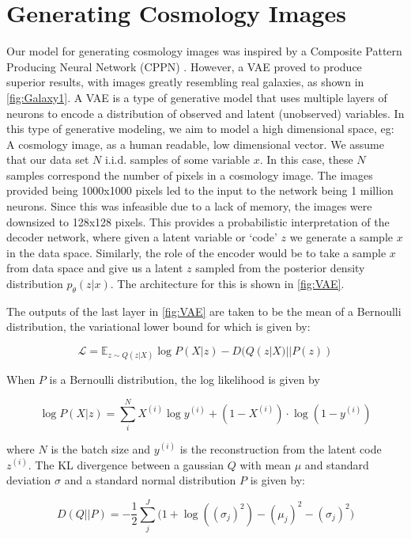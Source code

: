 \documentclass[journal]{IEEEtran}
\begin{document}
\section{Generating Cosmology Images}
Our model for generating cosmology images was inspired by a Composite Pattern Producing Neural Network (CPPN) \cite{CPPN}. However, a VAE proved to produce superior results, with images greatly resembling real galaxies, as shown in \ref{fig:Galaxy1}.
A VAE \cite{VAE} is a type of generative model that uses multiple layers of neurons to encode a distribution of observed and latent (unobserved) variables. In this type of generative modeling, we aim to model a high dimensional space, eg: A cosmology image, as a human readable, low dimensional vector. 
We assume that our data set $N$ i.i.d. samples of some variable $x$. In this case, these $N$ samples correspond the number of pixels in a cosmology image. The images provided being 1000x1000 pixels led to the input to the network being 1 million neurons. Since this was infeasible due to a lack of memory, the images were downsized to 128x128 pixels. This provides a probabilistic interpretation of the decoder network, where given a latent variable or `code' $z$ we generate a sample $x$ in the data space. Similarly, the role of the encoder would be to take a sample $x$ from data space and give us a latent $z$ sampled from the posterior density distribution $p_\theta(z|x)$. The architecture for this is shown in \ref{fig:VAE}. 

The outputs of the last layer in \ref{fig:VAE} are taken to be the mean of a Bernoulli distribution, the variational lower bound for which is given by:

\begin{equation}
\mathcal{L} = \mathbb{E}_{z\sim Q(z|X)}\log P(X|z) - D(Q(z|X)||P(z))
\end{equation}

When $P$ is a Bernoulli distribution, the log likelihood is given by

\begin{equation}
\log P(X|z) = \sum_i^N X^{(i)}\log y^{(i)} + (1 − X^{(i)}) \cdot \log(1 − y^{(i)})
\end{equation}

where $N$ is the batch size and $y^{(i)}$ is the reconstruction from the latent code $z^{(i)}$. The KL divergence between a gaussian $Q$ with mean $\mu$ and standard deviation $\sigma$ and a standard normal distribution $P$ is given by:

\begin{equation}
D(Q||P) = -\frac{1}{2}\sum_j^J \big(1 + \log((\sigma_j)^2) - (\mu_j)^2 - (\sigma_j)^2\big)
\end{equation}
\end{document}
